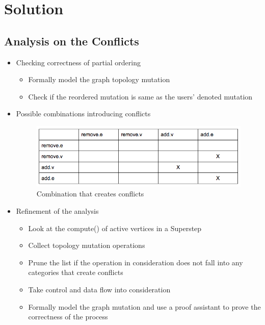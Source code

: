 \section{Solution}

\subsection{Analysis on the Conflicts}

\begin{frame}
	\begin{itemize}
		\item Checking correctness of partial ordering	
		\linebreak
		\begin{itemize}
			\item Formally model the graph topology mutation
			\linebreak
			\item Check if  the reordered mutation is same as the users' denoted mutation
		\end{itemize}
	\end{itemize}
\end{frame}

\begin{frame}
	\begin{itemize}
		\item Possible combinations introducing conflicts
		\linebreak
			\begin{figure}
			\includegraphics[width=0.8\linewidth]{figures/table.jpg}
			\caption{Combination that creates conflicts}
			\end{figure}
	\end{itemize}
\end{frame}

\begin{frame}	
		 \begin{itemize}
		      \item Refinement of the analysis
		      \linebreak
		   	  \begin{itemize}
				\item Look at the compute() of active vertices in a Superstep 
				\item Collect topology mutation operations
				\item Prune the list if the operation in consideration does not fall into any categories that create conflicts
				\item Take control and data flow into consideration
				\item Formally model the graph mutation and use a proof assistant to prove the correctness of the process
		     	  \end{itemize}
		  \end{itemize}
\end{frame}

